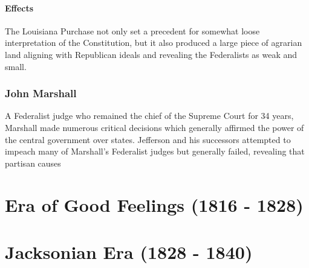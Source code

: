 \documentclass{article}
\begin{document}
    \paragraph{Effects}
    The Louisiana Purchase not only set a precedent for somewhat loose interpretation of the Constitution, but it also produced a large piece of agrarian land aligning with Republican ideals and revealing the Federalists as weak and small.
    \subsubsection{John Marshall}
    A Federalist judge who remained the chief of the Supreme Court for 34 years, Marshall made numerous critical decisions which generally affirmed the power of the central government over states. Jefferson and his successors attempted to impeach many of Marshall's Federalist judges but generally failed, revealing that partisan causes 
    \subsection{\color{purple}{Economy}}
    \subsection{\color{orange}{Social}}
    \section {Era of Good Feelings (1816 - 1828)}
    \section{Jacksonian Era (1828 - 1840)} 
    
    
\end{document}
